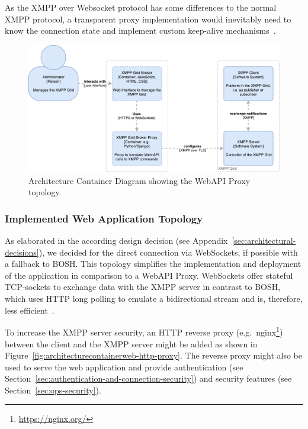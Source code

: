 As the XMPP over Websocket protocol has some differences to the normal XMPP protocol, a transparent proxy implementation would inevitably need to know the connection state and implement custom keep-alive mechanisms~\cite{rfc7395}.

\begin{figure}[H]
\centering
\includegraphics[width=0.8\linewidth]{resources/architecture_container_proxy}
\caption[Architecture Container Diagram: Web Proxy]{Architecture Container Diagram showing the WebAPI Proxy topology.}
\label{fig:architecturecontainerwebproxy}
\end{figure}

\subsubsection{Implemented Web Application Topology}\label{sec:implemented-web-application-topology}

As elaborated in the according design decision (see Appendix~\ref{sec:architectural-decisions}), we decided for the direct connection via WebSockets, if possible with a fallback to BOSH.
This topology simplifies the implementation and deployment of the application in comparison to a WebAPI Proxy.
WebSockets offer stateful TCP-sockets to exchange data with the XMPP server in contrast to BOSH, which uses HTTP long polling to emulate a bidirectional stream and is, therefore, less efficient~\cite{xep-0124}.

To increase the XMPP server security, an HTTP reverse proxy (e.g.\ nginx\footnote{\url{https://nginx.org/}}) between the client and the XMPP server might be added as shown in Figure~\ref{fig:architecturecontainerweb-http-proxy}.
The reverse proxy might also be used to serve the web application and provide authentication (see Section~\ref{sec:authentication-and-connection-security}) and security features (see Section~\ref{sec:ops-security}).

